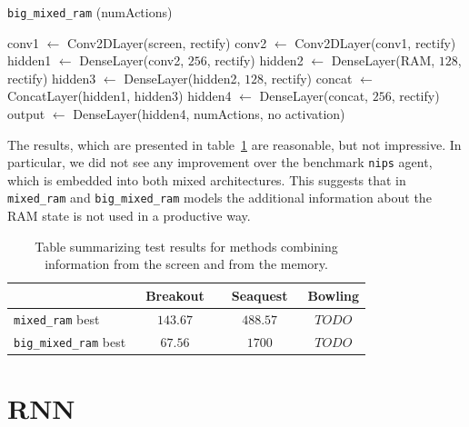 \begin{algorithm}[H]
\caption{\texttt{big\_mixed\_ram} (numActions)}

\SetAlgoVlined
\DontPrintSemicolon

\vspace{0.05cm}

conv1 $\leftarrow$ Conv2DLayer(screen, rectify)\;
conv2 $\leftarrow$ Conv2DLayer(conv1, rectify)\;
hidden1 $\leftarrow$ DenseLayer(conv2, $256$, rectify)\;
hidden2 $\leftarrow$ DenseLayer(RAM, $128$, rectify)\;
hidden3 $\leftarrow$ DenseLayer(hidden2, $128$, rectify)\;
concat $\leftarrow$ ConcatLayer(hidden1, hidden3)\;
hidden4 $\leftarrow$ DenseLayer(concat, $256$, rectify)\;
output $\leftarrow$ DenseLayer(hidden4, numActions, no activation)\;

\end{algorithm}

The results, which are presented in table~\ref{table:mixed} are reasonable, but not impressive. In particular, we did not see any improvement over the benchmark \texttt{nips} agent, which is embedded into both mixed architectures. This suggests that in \texttt{mixed\_ram} and \texttt{big\_mixed\_ram} models the additional information about the RAM state is not used in a productive way.

\begin{table}[h]
\centering
\begin{tabularx}{0.7\textwidth}{ X c c c }
  \toprule
  &\ Breakout\ &\ Seaquest\ & Bowling \\
  \midrule
  \texttt{mixed\_ram} best & $143.67$ & $488.57$ & $TODO$\\
  \texttt{big\_mixed\_ram} best  & $67.56$ & $1700$ & $TODO$\\
  \bottomrule
\end{tabularx}
\caption{Table summarizing test results for methods combining information from the screen and from the memory.}
\label{table:mixed}
\end{table}

\section{RNN}

